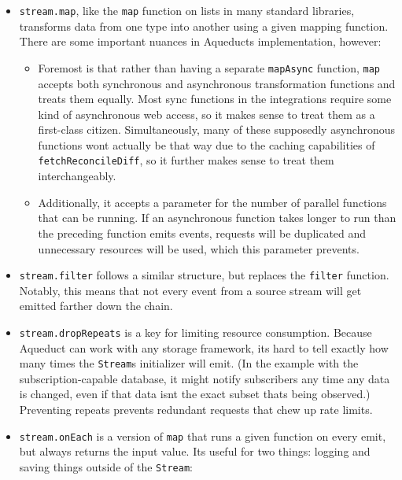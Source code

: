 \documentclass[manuscript,review,anonymous]{acmart}
\begin{document}
\begin{itemize}
\tightlist
\item
  \texttt{stream.map}, like the \texttt{map} function on lists in many
  standard libraries, transforms data from one type into another using a
  given mapping function. There are some important nuances in
  Aqueduct\textquotesingle s implementation, however:

  \begin{itemize}
  \tightlist
  \item
    Foremost is that rather than having a separate \texttt{mapAsync}
    function, \texttt{map} accepts both synchronous and asynchronous
    transformation functions and treats them equally. Most sync
    functions in the integrations require some kind of asynchronous web
    access, so it makes sense to treat them as a first-class citizen.
    Simultaneously, many of these supposedly asynchronous functions
    won\textquotesingle t actually be that way due to the caching
    capabilities of \texttt{fetchReconcileDiff}, so it further makes
    sense to treat them interchangeably.
  \item
    Additionally, it accepts a parameter for the number of parallel
    functions that can be running. If an asynchronous function takes
    longer to run than the preceding function emits events, requests
    will be duplicated and unnecessary resources will be used, which
    this parameter prevents.
  \end{itemize}
\item
  \texttt{stream.filter} follows a similar structure, but replaces the
  \texttt{filter} function. Notably, this means that not every event
  from a source stream will get emitted farther down the chain.
\item
  \texttt{stream.dropRepeats} is a key for limiting resource
  consumption. Because Aqueduct can work with any storage framework,
  it\textquotesingle s hard to tell exactly how many times the
  \texttt{Stream}\textquotesingle s initializer will emit. (In the
  example with the subscription-capable database, it might notify
  subscribers any time any data is changed, even if that data
  isn\textquotesingle t the exact subset that\textquotesingle s being
  observed.) Preventing repeats prevents redundant requests that chew up
  rate limits.
\item
  \texttt{stream.onEach} is a version of \texttt{map} that runs a given
  function on every emit, but always returns the input value.
  It\textquotesingle s useful for two things: logging and saving things
  outside of the \texttt{Stream}:


\end{itemize}
\end{document}
